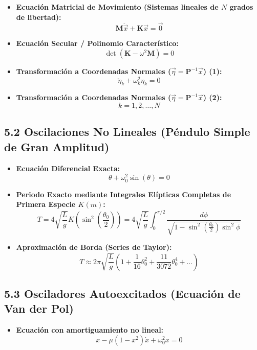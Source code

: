 \documentclass[11pt,a4paper]{article}
\begin{document}
\begin{itemize}
  \item \textbf{Ecuación Matricial de Movimiento (Sistemas lineales de $N$ grados de libertad):}
  \[
    \mathbf{M} \ddot{\vec{x}} + \mathbf{K} \vec{x} = \vec{0}
  \]
  \item \textbf{Ecuación Secular / Polinomio Característico:}
  \[
    \det(\mathbf{K} - \omega^2 \mathbf{M}) = 0
  \]
  \item \textbf{Transformación a Coordenadas Normales ($\vec{\eta} = \mathbf{P}^{-1} \vec{x}$) (1):}
  \[
    \ddot{\eta}_k + \omega_k^2 \eta_k = 0
  \]
  \item \textbf{Transformación a Coordenadas Normales ($\vec{\eta} = \mathbf{P}^{-1} \vec{x}$) (2):}
  \[
    k = 1, 2, \dots, N
  \]
\end{itemize}

\subsection*{5.2 Oscilaciones No Lineales (Péndulo Simple de Gran Amplitud)}

\begin{itemize}
  \item \textbf{Ecuación Diferencial Exacta:}
  \[
    \ddot{\theta} + \omega_0^2 \sin(\theta) = 0
  \]
  \item \textbf{Periodo Exacto mediante Integrales Elípticas Completas de Primera Especie $K(m)$:}
  \[
    T = 4\sqrt{\frac{L}{g}} K\left(\sin^2\left(\frac{\theta_0}{2}\right)\right) = 4\sqrt{\frac{L}{g}} \int_0^{\pi/2} \frac{d\phi}{\sqrt{1 - \sin^2\left(\frac{\theta_0}{2}\right) \sin^2\phi}}
  \]
  \item \textbf{Aproximación de Borda (Series de Taylor):}
  \[
    T \approx 2\pi\sqrt{\frac{L}{g}} \left( 1 + \frac{1}{16}\theta_0^2 + \frac{11}{3072}\theta_0^4 + \dots \right)
  \]
\end{itemize}

\subsection*{5.3 Osciladores Autoexcitados (Ecuación de Van der Pol)}

\begin{itemize}
  \item \textbf{Ecuación con amortiguamiento no lineal:}
  \[
    \ddot{x} - \mu(1 - x^2)\dot{x} + \omega_0^2 x = 0
  \]
\end{itemize}
\end{document}
